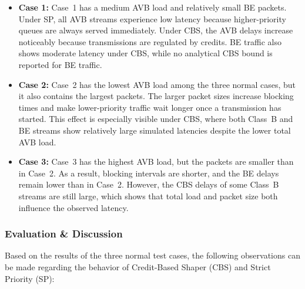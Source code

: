 \begin{itemize}
\item \textbf{Case 1:}
Case~1 has a medium AVB load and relatively small BE packets. Under SP, all AVB streams experience low latency because higher-priority queues are always served immediately. Under CBS, the AVB delays increase noticeably because transmissions are regulated by credits. BE traffic also shows moderate latency under CBS, while no analytical CBS bound is reported for BE traffic.

\item \textbf{Case 2:}
Case~2 has the lowest AVB load among the three normal cases, but it also contains the largest packets. The larger packet sizes increase blocking times and make lower-priority traffic wait longer once a transmission has started. This effect is especially visible under CBS, where both Class~B and BE streams show relatively large simulated latencies despite the lower total AVB load.

\item \textbf{Case 3:}
Case~3 has the highest AVB load, but the packets are smaller than in Case~2. As a result, blocking intervals are shorter, and the BE delays remain lower than in Case~2. However, the CBS delays of some Class~B streams are still large, which shows that total load and packet size both influence the observed latency.
\end{itemize}

\subsubsection{Evaluation \& Discussion}

Based on the results of the three normal test cases, the following observations can be made regarding the behavior of Credit-Based Shaper (CBS) and Strict Priority (SP):

